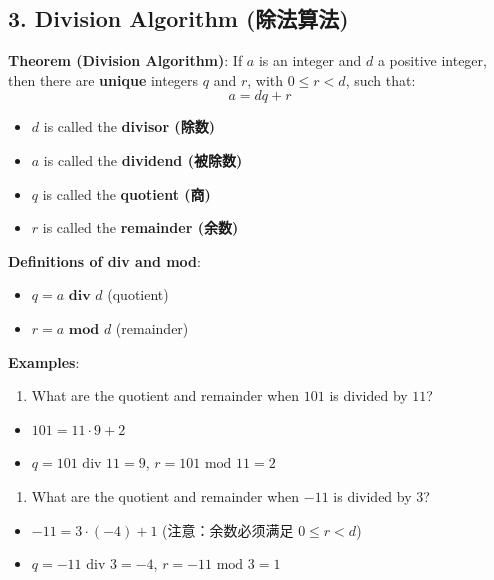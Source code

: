 \documentclass[10pt,a4paper,openany]{ctexbook}
\theoremstyle{definition}
\theoremstyle{remark}
\begin{document}
\vspace{-2pt}

\subsection{3. Division Algorithm (除法算法)}

\textbf{Theorem (Division Algorithm)}: If $a$ is an integer and $d$ a positive integer, then there are \textbf{unique} integers $q$ and $r$, with $0 \leq r < d$, such that:
\[
a = dq + r
\]

\begin{itemize}
\item $d$ is called the \textbf{divisor (除数)}
\item $a$ is called the \textbf{dividend (被除数)}
\item $q$ is called the \textbf{quotient (商)}
\item $r$ is called the \textbf{remainder (余数)}

\end{itemize}

\textbf{Definitions of div and mod}:
\begin{itemize}
\item $q = a \textbf{ div } d$ (quotient)
\item $r = a \textbf{ mod } d$ (remainder)

\end{itemize}

\textbf{Examples}:
\begin{enumerate}
\item What are the quotient and remainder when $101$ is divided by $11$?
\end{enumerate}

\begin{itemize}
\item $101 = 11 \cdot 9 + 2$
\item $q = 101 \text{ div } 11 = 9$, $r = 101 \text{ mod } 11 = 2$

\end{itemize}

\begin{enumerate}
\item What are the quotient and remainder when $-11$ is divided by $3$?
\end{enumerate}

\begin{itemize}
\item $-11 = 3 \cdot (-4) + 1$ (注意：余数必须满足 $0 \leq r < d$)
\item $q = -11 \text{ div } 3 = -4$, $r = -11 \text{ mod } 3 = 1$

\end{itemize}
\end{document}
